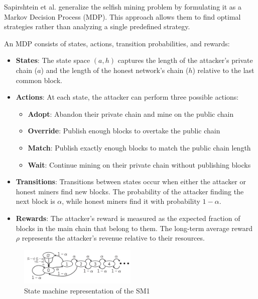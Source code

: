 \documentclass[conference]{IEEEtran}
\begin{document}
Sapirshtein et al. generalize the selfish mining problem by formulating it as a Markov Decision Process (MDP). This approach allows them to find optimal strategies rather than analyzing a single predefined strategy.

An MDP consists of states, actions, transition probabilities, and rewards:

\begin{itemize}
    \item \textbf{States}: The state space $(a,h)$ captures the length of the attacker's private chain ($a$) and the length of the honest network's chain ($h$) relative to the last common block.
    
    \item \textbf{Actions}: At each state, the attacker can perform three possible actions:
    \begin{itemize}
        \item \textbf{Adopt}: Abandon their private chain and mine on the public chain
        \item \textbf{Override}: Publish enough blocks to overtake the public chain
        \item \textbf{Match}: Publish exactly enough blocks to match the public chain length
        \item \textbf{Wait}: Continue mining on their private chain without publishing blocks
    \end{itemize}
    
    \item \textbf{Transitions}: Transitions between states occur when either the attacker or honest miners find new blocks. The probability of the attacker finding the next block is $\alpha$, while honest miners find it with probability $1-\alpha$.
    
    \item \textbf{Rewards}: The attacker's reward is measured as the expected fraction of blocks in the main chain that belong to them. The long-term average reward $\rho$ represents the attacker's revenue relative to their resources.
\end{itemize}

\begin{figure}[h!]
    \centering
    \includegraphics[width=0.5\textwidth]{src/State machine with transition frequencies.png}
    \caption{State machine representation of the SM1}
    \label{fig:state_machine}
\end{figure}
\end{document}

